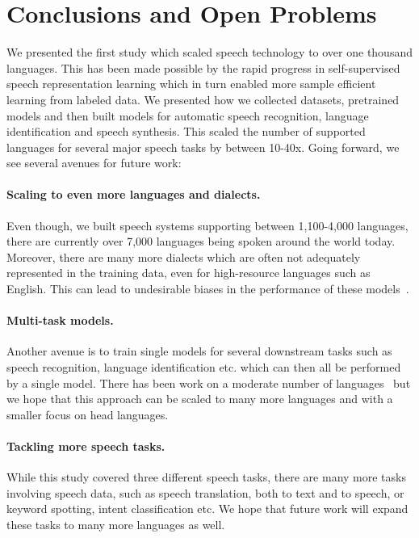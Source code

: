 \section{Conclusions and Open Problems}

We presented the first study which scaled speech technology to over one thousand languages. 
This has been made possible by the rapid progress in self-supervised speech representation learning which in turn enabled more sample efficient learning from labeled data. 
We presented how we collected datasets, pretrained models and then built models for automatic speech recognition, language identification and speech synthesis.
This scaled the number of supported languages for several major speech tasks by between 10-40x. Going forward, we see several avenues for future work:

\paragraph{Scaling to even more languages and dialects.}
Even though, we built speech systems supporting between 1,100-4,000 languages, there are currently over 7,000 languages being spoken around the world today. 
Moreover, there are many more dialects which are often not adequately represented in the training data, even for high-resource languages such as English. 
This can lead to undesirable biases in the performance of these models~\citep{koenecke2020racial}.

\paragraph{Multi-task models.}
Another avenue is to train single models for several downstream tasks such as speech recognition, language identification etc. which can then all be performed by a single model. 
There has been work on a moderate number of languages~\citep{radford2022whisper} but we hope that this approach can be scaled to many more languages and with a smaller focus on head languages.

\paragraph{Tackling more speech tasks.}
While this study covered three different speech tasks, there are many more tasks involving speech data, such as speech translation, both to text and to speech, or keyword spotting, intent classification etc. We hope that future work will expand these tasks to many more languages as well.
